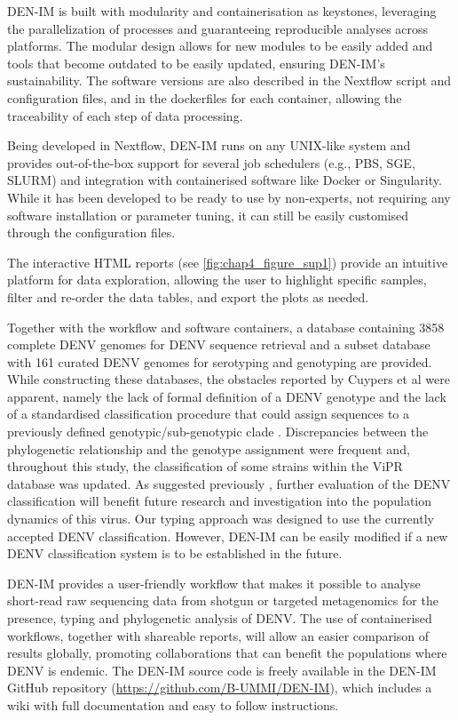 DEN-IM is built with modularity and containerisation as keystones, leveraging the parallelization of processes and guaranteeing reproducible analyses across platforms. The modular design allows for new modules to be easily added and tools that become outdated to be easily updated, ensuring DEN-IM’s sustainability. The software versions are also described in the Nextflow script and configuration files, and in the dockerfiles for each container, allowing the traceability of each step of data processing.

Being developed in Nextflow, DEN-IM runs on any UNIX-like system and provides out-of-the-box support for several job schedulers (e.g., PBS, SGE, SLURM) and integration with containerised software like Docker or Singularity. While it has been developed to be ready to use by non-experts, not requiring any software installation or parameter tuning, it can still be easily customised through the configuration files.

The interactive HTML reports (see \ref{fig:chap4_figure_sup1}) provide an intuitive platform for data exploration, allowing the user to highlight specific samples, filter and re-order the data tables, and export the plots as needed.

Together with the workflow and software containers, a database containing 3858 complete DENV genomes for DENV sequence retrieval and a subset database with 161 curated DENV genomes for serotyping and genotyping are provided. While constructing these databases, the obstacles reported by Cuypers et al \citep{cuypers_time_2018} were apparent, namely the lack of formal definition of a DENV genotype and the lack of a standardised classification procedure that could assign sequences to a previously defined genotypic/sub-genotypic clade \citep{cuypers_time_2018}. Discrepancies between the phylogenetic relationship and the genotype assignment were frequent and, throughout this study, the classification of some strains within the ViPR database \citep{pickett_virus_2012} was updated. As suggested previously \citep{cuypers_time_2018}, further evaluation of the DENV classification will benefit future research and investigation into the population dynamics of this virus. Our typing approach was designed to use the currently accepted DENV classification. However, DEN-IM can be easily modified if a new DENV classification system is to be established in the future.

DEN-IM provides a user-friendly workflow that makes it possible to analyse short-read raw sequencing data from shotgun or targeted metagenomics for the presence, typing and phylogenetic analysis of DENV. The use of containerised workflows, together with shareable reports, will allow an easier comparison of results globally, promoting collaborations that can benefit the populations where DENV is endemic. The DEN-IM source code is freely available in the DEN-IM GitHub repository (\url{https://github.com/B-UMMI/DEN-IM}), which includes a wiki with full documentation and easy to follow instructions.

